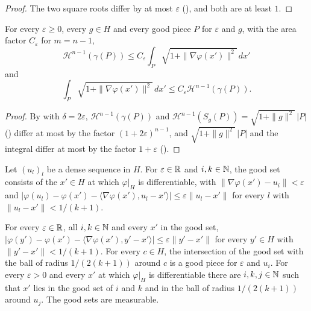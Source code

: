 \begin{proof}
\leanok
The two square roots differ by at most $\varepsilon$ (), and both are at
least $1$.
\end{proof}

\begin{lemma}
\label{lem:good-piece-bounds}
\leanok
{}
For every $\varepsilon \geq 0$, every $g \in H$ and every good piece $P$ for $\varepsilon$ and $g$,
with the area factor $C_\varepsilon$ for $m = n - 1$,
\[
  \mathcal H^{n-1}(\gamma(P)) \leq C_\varepsilon \int_P \sqrt{1 + \|\nabla\varphi(x')\|^2} \, dx'
\]
and
\[
  \int_P \sqrt{1 + \|\nabla\varphi(x')\|^2} \, dx' \leq C_\varepsilon \mathcal H^{n-1}(\gamma(P)).
\]
\end{lemma}

\begin{proof}
\leanok
By  with $\delta = 2\varepsilon$, $\mathcal H^{n-1}(\gamma(P))$
and $\mathcal H^{n-1}(S_g(P)) = \sqrt{1 + \|g\|^2} \, |P|$ () differ
at most by the factor $(1 + 2\varepsilon)^{n-1}$, and $\sqrt{1 + \|g\|^2} \, |P|$ and the integral
differ at most by the factor $1 + \varepsilon$ ().
\end{proof}

\begin{definition}
\label{def:good-set}
\leanok
{}
Let $(u_l)_l$ be a dense sequence in $H$. For $\varepsilon \in \mathbb{R}$ and $i, k \in \mathbb{N}$, the good set
consists of the $x' \in H$ at which $\varphi|_H$ is differentiable, with
$\|\nabla\varphi(x') - u_i\| < \varepsilon$ and
$|\varphi(u_l) - \varphi(x') - \langle \nabla\varphi(x'), u_l - x' \rangle| \leq
\varepsilon \|u_l - x'\|$ for every $l$ with $\|u_l - x'\| < 1/(k+1)$.
\end{definition}

\begin{lemma}
\label{lem:good-set}
\leanok
{}
For every $\varepsilon \in \mathbb{R}$, all $i, k \in \mathbb{N}$ and every $x'$ in the good set,
$|\varphi(y') - \varphi(x') - \langle \nabla\varphi(x'), y' - x' \rangle| \leq
\varepsilon \|y' - x'\|$ for every $y' \in H$ with $\|y' - x'\| < 1/(k+1)$. For every
$c \in H$, the intersection of the good set with the ball of radius $1/(2(k+1))$ around $c$ is a
good piece for $\varepsilon$ and $u_i$. For every $\varepsilon > 0$ and every $x'$ at which
$\varphi|_H$ is differentiable there are $i, k, j \in \mathbb{N}$ such that $x'$ lies in the good set of
$i$ and $k$ and in the ball of radius $1/(2(k+1))$ around $u_j$. The good sets are measurable.
\end{lemma}

